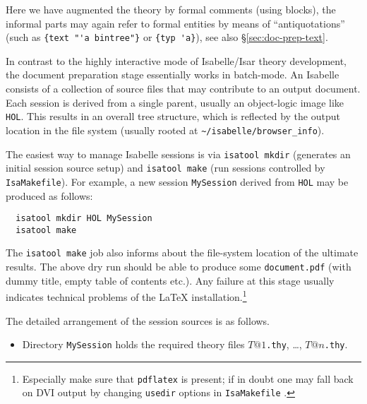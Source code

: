 \begin{isabellebody}
\begin{isamarkuptext}
  \noindent Here we have augmented the theory by formal comments
  (using  blocks), the informal parts may again refer
  to formal entities by means of ``antiquotations'' (such as
  \texttt{\at}\verb,{text "'a bintree"}, or
  \texttt{\at}\verb,{typ 'a},), see also \S\ref{sec:doc-prep-text}.%
\end{isamarkuptext}%
\isamarkuptrue%
%
\isamarkuptrue%
%
\begin{isamarkuptext}%
In contrast to the highly interactive mode of Isabelle/Isar theory
  development, the document preparation stage essentially works in
  batch-mode.  An Isabelle  consists of a collection
  of source files that may contribute to an output document.  Each
  session is derived from a single parent, usually an object-logic
  image like \texttt{HOL}.  This results in an overall tree structure,
  which is reflected by the output location in the file system
  (usually rooted at \verb,~/isabelle/browser_info,).

  \medskip The easiest way to manage Isabelle sessions is via
  \texttt{isatool mkdir} (generates an initial session source setup)
  and \texttt{isatool make} (run sessions controlled by
  \texttt{IsaMakefile}).  For example, a new session
  \texttt{MySession} derived from \texttt{HOL} may be produced as
  follows:

\begin{verbatim}
  isatool mkdir HOL MySession
  isatool make
\end{verbatim}

  The \texttt{isatool make} job also informs about the file-system
  location of the ultimate results.  The above dry run should be able
  to produce some \texttt{document.pdf} (with dummy title, empty table
  of contents etc.).  Any failure at this stage usually indicates
  technical problems of the {\LaTeX} installation.\footnote{Especially
  make sure that \texttt{pdflatex} is present; if in doubt one may
  fall back on DVI output by changing \texttt{usedir} options in
  \texttt{IsaMakefile} \cite{isabelle-sys}.}

  \medskip The detailed arrangement of the session sources is as
  follows.

  \begin{itemize}

  \item Directory \texttt{MySession} holds the required theory files
  $T@1$\texttt{.thy}, \dots, $T@n$\texttt{.thy}.


\end{itemize}
\end{isamarkuptext}
\end{isabellebody}
